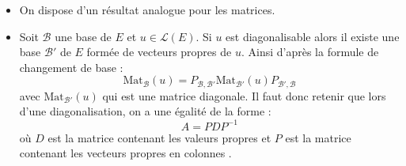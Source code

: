 \documentclass[french,11pt,twoside]{VcCours}
\begin{document}
\begin{Demonstration}{}
%
\end{Demonstration}

\begin{Remarques}{}
\begin{itemize} 
\item On dispose d'un résultat analogue pour les matrices. 
\item Soit $\mathcal{B}$ une base de $E$ et $u \in \mathcal{L}(E)$. Si $u$ est diagonalisable alors il existe une base $\mathcal{B'}$ de $E$ formée de vecteurs propres de $u$. Ainsi d'après la formule de changement de base :
$$ \textrm{Mat}_{\mathcal{B}}(u) = P_{\mathcal{B}, \mathcal{B}'}  \textrm{Mat}_{\mathcal{B}'}(u) P_{\mathcal{B}', \mathcal{B}}$$
avec $\textrm{Mat}_{\mathcal{B}'}(u)$ qui est une matrice diagonale. Il faut donc retenir que lors d'une diagonalisation, on a une égalité de la forme :
$$ A = P D P^{-1}$$
où $D$ est la matrice contenant les valeurs propres et $P$ est la matrice contenant les vecteurs propres \og en colonnes \fg.
\end{itemize}
\end{Remarques}
\end{document}
